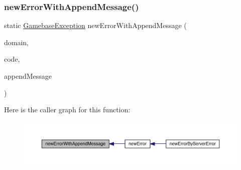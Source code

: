 \subsubsection{\texorpdfstring{new\+Error\+With\+Append\+Message()}{newErrorWithAppendMessage()}\hspace{0.1cm}{\footnotesize\ttfamily [1/2]}}
{\footnotesize\ttfamily static \hyperlink{classcom_1_1toast_1_1android_1_1gamebase_1_1base_1_1_gamebase_exception}{Gamebase\+Exception} new\+Error\+With\+Append\+Message (\begin{DoxyParamCaption}\item[{@Non\+Null final String}]{domain,  }\item[{final int}]{code,  }\item[{@Nullable String}]{append\+Message }\end{DoxyParamCaption})\hspace{0.3cm}{\ttfamily [static]}}

Here is the caller graph for this function\+:
\nopagebreak
\begin{figure}[H]
\begin{center}
\leavevmode
\includegraphics[width=350pt]{classcom_1_1toast_1_1android_1_1gamebase_1_1base_1_1_gamebase_error_a2ed49c27d7a237cd7fcdaa43604c9615_icgraph}
\end{center}
\end{figure}
\mbox{\label{classcom_1_1toast_1_1android_1_1gamebase_1_1base_1_1_gamebase_error_a6aa42722f0af25a63811f924fd940552}} 
